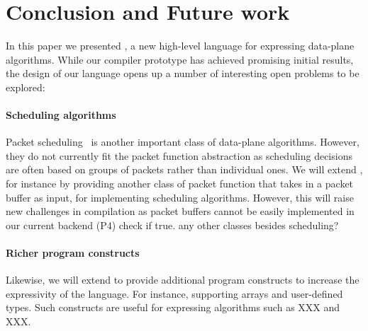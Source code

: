 \section{Conclusion and Future work}
\label{s:future}

%
%


\label{s:future}

In this paper we presented \pktlanguage, a new high-level language for expressing 
data-plane
algorithms. While our compiler prototype has achieved promising initial results, 
the design of our language opens up 
a number of interesting open problems to be explored:

\paragraph{Scheduling algorithms}
Packet scheduling~\cite{XXX, XXX} is another important class of data-plane algorithms.
However, they do not currently fit the \pktlanguage packet function abstraction
as scheduling decisions are often based on groups of packets rather than individual
ones. We will extend \pktlanguage, for instance by providing another class of packet
function that takes in a packet buffer as input, for implementing scheduling algorithms.
However, this will raise new challenges in compilation as packet buffers cannot be
easily implemented in our current backend (P4) \ac{check if true}.
\ac{any other classes besides scheduling?}

\paragraph{Richer program constructs}
Likewise, we will extend \pktlanguage to provide additional program constructs
to increase the expressivity of the language. For instance, supporting 
arrays and user-defined types. Such constructs are useful for expressing 
algorithms such as XXX and XXX.

